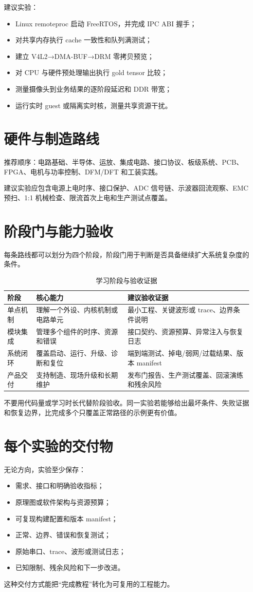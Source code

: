 建议实验：
\begin{itemize}
  \item Linux remoteproc 启动 FreeRTOS，并完成 IPC ABI 握手；
  \item 对共享内存执行 cache 一致性和队列满测试；
  \item 建立 V4L2→DMA-BUF→DRM 零拷贝预览；
  \item 对 CPU 与硬件预处理输出执行 gold tensor 比较；
  \item 测量摄像头到业务结果的逐阶段延迟和 DDR 带宽；
  \item 运行实时 guest 或隔离实时核，测量共享资源干扰。
\end{itemize}

\section{硬件与制造路线}

推荐顺序：电路基础、半导体、运放、集成电路、接口协议、板级系统、PCB、FPGA、电机与功率控制、DFM/DFT 和工装实践。

建议实验应包含电源上电时序、接口保护、ADC 信号链、示波器回流观察、EMC 预扫、1:1 机械检查、限流首次上电和生产测试点覆盖。

\section{阶段门与能力验收}

每条路线都可以划分为四个阶段，阶段门用于判断是否具备继续扩大系统复杂度的条件。

\begin{table}[htbp]
  \centering
  \caption{学习阶段与验收证据}
  \begin{tabular}{p{24mm}p{48mm}p{68mm}}
    \hline
    阶段 & 核心能力 & 建议验收证据 \\
    \hline
    单点机制 & 理解一个外设、内核机制或电路单元 & 最小工程、关键波形或 trace、边界条件说明 \\
    模块集成 & 管理多个组件的时序、资源和错误 & 接口契约、资源预算、异常注入与恢复日志 \\
    系统闭环 & 覆盖启动、运行、升级、诊断和复位 & 端到端测试、掉电/弱网/过载结果、版本 manifest \\
    产品交付 & 支持制造、现场升级和长期维护 & 发布门报告、生产测试覆盖、回滚演练和残余风险 \\
    \hline
  \end{tabular}
\end{table}

不要用代码量或学习时长代替阶段验收。同一实验若能够给出最坏条件、失败证据和恢复边界，比完成多个只覆盖正常路径的示例更有价值。

\section{每个实验的交付物}

无论方向，实验至少保存：
\begin{itemize}
  \item 需求、接口和明确验收指标；
  \item 原理图或软件架构与资源预算；
  \item 可复现构建配置和版本 manifest；
  \item 正常、边界、错误和恢复测试；
  \item 原始串口、trace、波形或测试日志；
  \item 已知限制、残余风险和下一步改进。
\end{itemize}

这种交付方式能把“完成教程”转化为可复用的工程能力。
